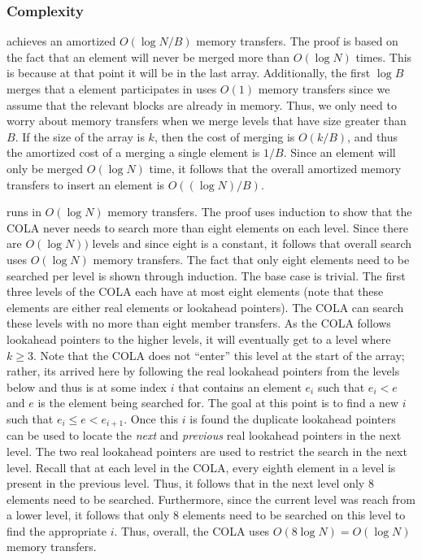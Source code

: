 \documentclass[preprint]{style}
\begin{document}
\subsubsection{Complexity}

\Insert{} achieves an amortized $O(\log N / B)$ memory transfers. The proof is
based on the fact that an element will never be merged more than $O(\log{N})$
times. This is because at that point it will be in the last array.
Additionally, the first $\log{B}$ merges that a element participates in uses
$O(1)$ memory transfers since we assume that the relevant blocks are already in
memory. Thus, we only need to worry about memory transfers when we merge levels
that have size greater than $B$. If the size of the array is $k$, then the cost
of merging is $O(k/B)$, and thus the amortized cost of a merging a single
element is $1/B$. Since an element will only be merged $O(\log{N})$ time, it
follows that the overall amortized memory transfers to insert an element is
$O((\log N)/B)$.

\Search{} runs in $O(\log N)$ memory transfers. The proof uses induction to
show that the COLA never needs to search more than eight elements on each
level. Since there are $O(\log N))$ levels and since eight is a constant, it
follows that overall search uses $O(\log N)$ memory transfers. The fact that
only eight elements need to be searched per level is shown through induction.
The base case is trivial. The first three levels of the COLA each have at most
eight elements (note that these elements are either real elements or
lookahead pointers). The COLA can search these levels with no more
than eight member transfers. As the COLA follows lookahead pointers to the
higher levels, it will eventually get to a level where $k \geq 3$. Note that
the COLA does not ``enter'' this level at the start of the array; rather, its
arrived here by following the real lookahead pointers from the levels below
and thus is at some index $i$ that contains an element $e_i$ such that $e_i <
e$ and $e$ is the element being searched for. The goal at this point is to
find a new $i$ such that $e_i \leq e < e_{i+1}$. Once this $i$ is found the
duplicate lookahead pointers can be used to locate the \textit{next} and
\textit{previous} real lookahead pointers in the next level. The two real lookahead
pointers are used to restrict the search in the next level. Recall that at
each level in the COLA, every eighth element in a level is present in the
previous level. Thus, it follows that in the next level only 8 elements need
to be searched. Furthermore, since the current level was reach from a lower
level, it follows that only 8 elements need to be searched on this level to
find the appropriate $i$. Thus, overall, the COLA uses $O(8\log{N}) =
O(\log{N})$ memory transfers.
\end{document}
